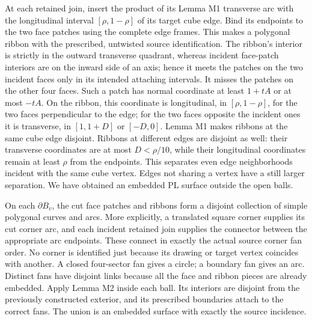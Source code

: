 \documentclass[
  11pt,
]{article}
\begin{document}
At each retained join, insert the product of its Lemma M1 transverse arc
with the longitudinal interval \([\rho,1-\rho]\) of its target cube
edge. Bind its endpoints to the two face patches using the complete edge
frames. This makes a polygonal ribbon with the prescribed, untwisted
source identification. The ribbon's interior is strictly in the outward
transverse quadrant, whereas incident face-patch interiors are on the
inward side of an axis; hence it meets the patches on the two incident
faces only in its intended attaching intervals. It misses the patches on
the other four faces. Such a patch has normal coordinate at least
\(1+tA\) or at most \(-tA\). On the ribbon, this coordinate is
longitudinal, in \([\rho,1-\rho]\), for the two faces perpendicular to
the edge; for the two faces opposite the incident ones it is transverse,
in \([1,1+D]\) or \([-D,0]\). Lemma M1 makes ribbons at the same cube
edge disjoint. Ribbons at different edges are disjoint as well: their
transverse coordinates are at most \(D<\rho/10\), while their
longitudinal coordinates remain at least \(\rho\) from the endpoints.
This separates even edge neighborhoods incident with the same cube
vertex. Edges not sharing a vertex have a still larger separation. We
have obtained an embedded PL surface outside the open balls.

On each \(\partial B_v\), the cut face patches and ribbons form a
disjoint collection of simple polygonal curves and arcs. More
explicitly, a translated square corner supplies its cut corner arc, and
each incident retained join supplies the connector between the
appropriate arc endpoints. These connect in exactly the actual source
corner fan order. No corner is identified just because its drawing or
target vertex coincides with another. A closed four-sector fan gives a
circle; a boundary fan gives an arc. Distinct fans have disjoint links
because all the face and ribbon pieces are already embedded. Apply Lemma
M2 inside each ball. Its interiors are disjoint from the previously
constructed exterior, and its prescribed boundaries attach to the
correct fans. The union is an embedded surface with exactly the source
incidence.
\end{document}
